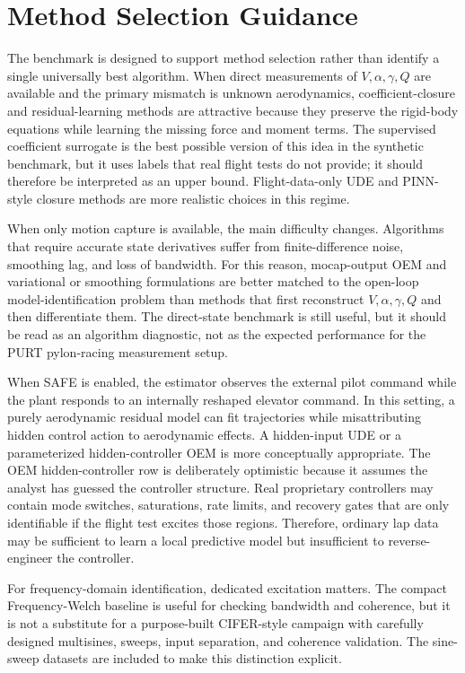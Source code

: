 \documentclass[11pt]{article}
\begin{document}
\section{Method Selection Guidance}
The benchmark is designed to support method selection rather than identify a
single universally best algorithm. When direct measurements of
$V,\alpha,\gamma,Q$ are available and the primary mismatch is unknown
aerodynamics, coefficient-closure and residual-learning methods are attractive
because they preserve the rigid-body equations while learning the missing force
and moment terms. The supervised coefficient surrogate is the best possible
version of this idea in the synthetic benchmark, but it uses labels that real
flight tests do not provide; it should therefore be interpreted as an upper
bound. Flight-data-only UDE and PINN-style closure methods are more realistic
choices in this regime.

When only motion capture is available, the main difficulty changes. Algorithms
that require accurate state derivatives suffer from finite-difference noise,
smoothing lag, and loss of bandwidth. For this reason, mocap-output OEM and
variational or smoothing formulations are better
matched to the open-loop model-identification problem than methods that first reconstruct
$V,\alpha,\gamma,Q$ and then differentiate them. The direct-state benchmark is
still useful, but it should be read as an algorithm diagnostic, not as the
expected performance for the PURT pylon-racing measurement setup.

When SAFE is enabled, the estimator observes the external pilot command while
the plant responds to an internally reshaped elevator command. In this setting,
a purely aerodynamic residual model can fit trajectories while misattributing
hidden control action to aerodynamic effects. A hidden-input UDE or a
parameterized hidden-controller OEM is more conceptually appropriate. The OEM
hidden-controller row is deliberately optimistic because it assumes the analyst
has guessed the controller structure. Real proprietary controllers may contain
mode switches, saturations, rate limits, and recovery gates that are only
identifiable if the flight test excites those regions. Therefore, ordinary lap
data may be sufficient to learn a local predictive model but insufficient to
reverse-engineer the controller.

For frequency-domain identification, dedicated excitation matters. The compact
Frequency-Welch baseline is useful for checking bandwidth and coherence, but it
is not a substitute for a purpose-built CIFER-style campaign with carefully
designed multisines, sweeps, input separation, and coherence validation. The
sine-sweep datasets are included to make this distinction explicit.
\end{document}
